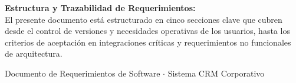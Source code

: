 \vspace*{0.5cm}
{
    \hypersetup{linkcolor=PrimaryNavy}
    \tableofcontents
}

\vfill

\begin{tcolorbox}[
    enhanced,
    colback=BgSoftGray,
    colframe=BorderGray,
    boxrule=0.8pt,
    arc=2mm,
    left=12pt,
    right=12pt,
    top=8pt,
    bottom=8pt
]
    \sffamily\small
    \textcolor{PrimaryNavy}{\textbf{Estructura y Trazabilidad de Requerimientos:}}\\
    El presente documento está estructurado en cinco secciones clave que cubren desde el control de versiones y necesidades operativas de los usuarios, hasta los criterios de aceptación en integraciones críticas y requerimientos no funcionales de arquitectura.
\end{tcolorbox}

\vspace{0.4cm}
\begin{center}
    \small\sffamily\textcolor{MutedText}{Documento de Requerimientos de Software $\cdot$ Sistema CRM Corporativo}
\end{center}
